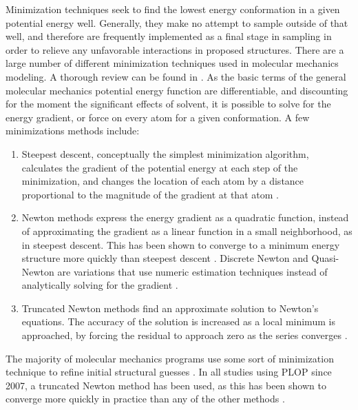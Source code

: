 Minimization techniques seek to find the lowest energy conformation in a given potential energy well.
Generally, they make no attempt to sample outside of that well, and therefore are frequently implemented as a final stage in sampling in order to relieve any unfavorable interactions in proposed structures.
There are a large number of different minimization techniques used in molecular mechanics modeling.
A thorough review can be found in \cite{schlick2010molecular}.
As the basic terms of the general molecular mechanics potential energy function are differentiable, and discounting for the moment the significant effects of solvent, it is possible to solve for the energy gradient, or force on every atom for a given conformation.
A few minimizations methods include:
\begin{enumerate}
\item Steepest descent, conceptually the simplest minimization algorithm, calculates the gradient of the potential energy at each step of the minimization, and changes the location of each atom by a distance proportional to the magnitude of the gradient at that atom \cite{levitt1969refinement,bixon1967potential}.
\item Newton methods express the energy gradient as a quadratic function, instead of approximating the gradient as a linear function in a small neighborhood, as in steepest descent.
This has been shown to converge to a minimum energy structure more quickly than steepest descent \cite{ponder1987efficient}.  
Discrete Newton and Quasi-Newton are variations that use numeric estimation techniques instead of analytically solving for the gradient \cite{schlick2010molecular}.
\item Truncated Newton methods find an approximate solution to Newton's equations.
The accuracy of the solution is increased as a local minimum is approached, by forcing the residual to approach zero as the series converges \cite{dembo1983truncated}.
\end{enumerate}

The majority of molecular mechanics programs use some sort of minimization technique to refine initial structural guesses \cite{ponder1987efficient,levitt1969refinement,bixon1967potential,zhu2007multiscale}.
In all studies using PLOP since 2007, a truncated Newton method has been used, as this has been shown to converge more quickly in practice than any of the other methods \cite{zhu2007multiscale}.



